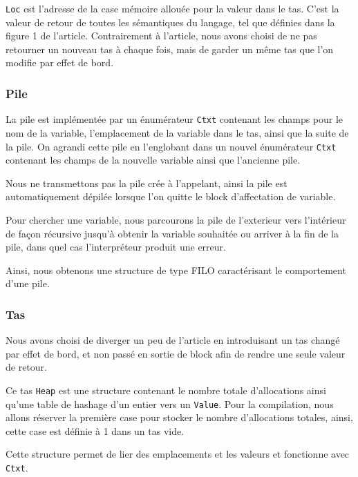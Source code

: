 \documentclass{rapportECL}
\begin{document}
\verb|Loc| est l'adresse de la case mémoire allouée pour la valeur dans le tas. C'est la valeur de retour de toutes les sémantiques 
du langage, tel que définies dans la figure 1 de l'article\cite{ullrich_counting_2020}.
Contrairement à l'article, nous avons choisi de ne pas retourner un nouveau tas à chaque fois, mais de garder un même tas que 
l'on modifie par effet de bord.

\medskip

\subsubsection{Pile}

La pile est implémentée par un énumérateur \verb|Ctxt| contenant les champs pour le nom de la variable, 
l'emplacement de la variable dans le tas, ainsi que la suite de la pile. 
On agrandi cette pile en l'englobant dans un nouvel énumérateur \verb|Ctxt| contenant les champs 
de la nouvelle variable ainsi que l'ancienne pile. 

Nous ne transmettons pas la pile crée à l'appelant, ainsi la pile est automatiquement dépilée lorsque l'on quitte le 
block d'affectation de variable.

Pour chercher une variable, nous parcourons la pile de l'exterieur vers l'intérieur de façon récursive jusqu'à obtenir la variable 
souhaitée ou arriver à la fin de la pile, dans quel cas l'interpréteur produit une erreur.

Ainsi, nous obtenons une structure de type FILO caractérisant le comportement d'une pile.

\medskip

\subsubsection{Tas}

Nous avons choisi de diverger un peu de l'article\cite{ullrich_counting_2020} en introduisant un tas changé par effet de bord, 
et non passé en sortie de block afin de rendre une seule valeur de retour.

Ce tas \verb|Heap| est une structure contenant le nombre totale d'allocations ainsi qu'une table de hashage d'un entier 
vers un \verb|Value|. Pour la compilation, nous allons réserver la première case pour stocker le nombre d'allocations totales,
ainsi, cette case est définie à 1 dans un tas vide.

Cette structure permet de lier des emplacements et les valeurs et fonctionne avec \verb|Ctxt|. 
\end{document}
